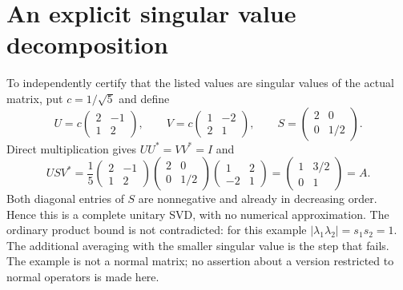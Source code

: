 \documentclass[11pt]{article}
\begin{document}
\newpage
\section{An explicit singular value decomposition}
To independently certify that the listed values are singular values of the
actual matrix, put $c=1/\sqrt5$ and define
\[
 U=c\begin{pmatrix}2&-1\\1&2\end{pmatrix},\qquad
 V=c\begin{pmatrix}1&-2\\2&1\end{pmatrix},\qquad
 S=\begin{pmatrix}2&0\\0&1/2\end{pmatrix}.
\]
Direct multiplication gives $UU^*=VV^*=I$ and
\[
 USV^*=\frac15
 \begin{pmatrix}2&-1\\1&2\end{pmatrix}
 \begin{pmatrix}2&0\\0&1/2\end{pmatrix}
 \begin{pmatrix}1&2\\-2&1\end{pmatrix}
 =\begin{pmatrix}1&3/2\\0&1\end{pmatrix}=A.
\]
Both diagonal entries of $S$ are nonnegative and already in decreasing
order. Hence this is a complete unitary SVD, with no numerical approximation.
The ordinary product bound is not contradicted: for this example
$|\lambda_1\lambda_2|=s_1s_2=1$. The additional averaging with the smaller
singular value is the step that fails. The example is not a normal matrix;
no assertion about a version restricted to normal operators is made here.
\end{document}
